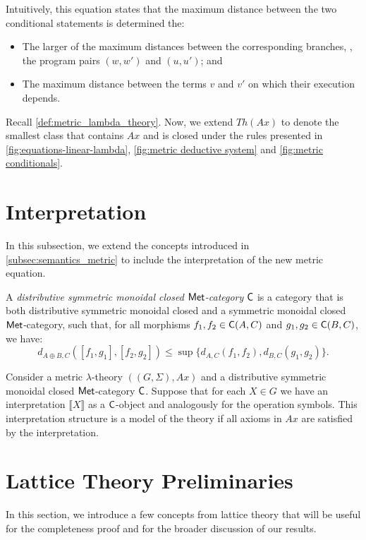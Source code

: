 Intuitively, this equation states that the maximum distance between the two conditional statements is determined the:

\begin{itemize}
    \item The larger of the maximum distances between the corresponding branches, \ie, the program pairs $(w, w')$ and $(u, u')$; and
    \item The maximum distance between the terms $v$ and $v'$ on which their execution depends.
\end{itemize}


Recall \autoref{def:metric_lambda_theory}. Now, we extend \( Th(Ax) \) to denote the smallest class that contains \( Ax \) and is closed under the rules presented in \autoref{fig:equations-linear-lambda}, \autoref{fig:metric deductive system} and \autoref{fig:metric conditionals}.


\section{Interpretation}

In this subsection, we extend the concepts introduced in \autoref{subsec:semantics_metric} to include the interpretation of the new metric equation.

\begin{definition}
  A \emph{distributive symmetric monoidal closed $\mathsf{Met}$-category} $\mathsf{C}$ is a category that is both distributive symmetric monoidal closed  and a symmetric monoidal closed $\mathsf{Met}$‑category, such that, for all morphisms $f_1, f_2 \in \mathsf{C}(A, C)$ and $g_1, g_2 \in \mathsf{C}(B, C)$, we have:
\[
  d_{A \oplus B, C}([f_1, g_1], [f_2, g_2]) \leq \sup \{d_{A,C}(f_1, f_2), d_{B,C}(g_1, g_2)\}.
\]
\end{definition}


\begin{definition}
  Consider a metric $\lambda$-theory $((G,\Sigma),Ax)$ and a distributive symmetric monoidal closed $\mathsf{Met}$-category $\mathsf{C}$. Suppose that for each $X \in G$ we have an interpretation $\llbracket X \rrbracket$ as a $\mathsf{C}$-object and analogously for the operation symbols. This interpretation structure is a model of the theory if all axioms in $Ax$ are satisfied by the interpretation.
\end{definition}


\section{Lattice Theory Preliminaries}
In this section, we introduce a few concepts from lattice theory that will be useful for the completeness proof and for the broader discussion of our results.


